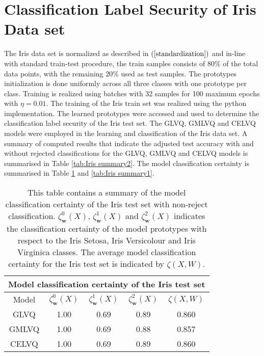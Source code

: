 \documentclass[english]{HSMW-Thesis}
\begin{document}
\section{Classification Label Security of Iris Data set}
The Iris data set is normalized as described in $\left( \ref{standardization}\right) $  and in-line with standard train-test procedure, the train samples consists of $80\%$ of the total data points, with the remaining $20\%$ used as test samples. The prototypes initialization is done uniformly across all three classes with one prototype per class. Training is realized using batches with 32 samples for 100 maximum epochs with $\eta =0.01$. The training of the Iris train set was realized using the python implementation\cite{Ravichandran2020}.
The learned prototypes were accessed and used to determine the classification label security of the Iris test set. The GLVQ, GMLVQ and CELVQ models were employed in the learning and classification of the Iris data set. A summary of computed results that indicate the adjusted test accuracy with and without rejected classifications for the GLVQ, GMLVQ and CELVQ models is summarised in Table \ref{tab:Iris summary2}. The model classification certainty is summarised in Table \ref{tab:Iris summary} and \ref{tab:Iris summary1}.
\begin{table}[H]
	\centering
	\begin{tabular}{ |c|c|c|c|c|  }
		\hline
		\multicolumn{5}{|c|}{Model classification certainty of the Iris test set} \\
		\hline
		Model &$\zeta_{\mathbf{w}}^{0}(X) $   & $\zeta_{\mathbf{w}}^{1}(X)$ &$\zeta_{\mathbf{w}}^{2}(X)$  &$\zeta(X,W)$   \\
		\hline
		GLVQ & 1.00 &0.69  & 0.89 &0.860  \\
		GMLVQ &1.00 &0.69  &0.88 &0.857   \\
		CELVQ  &1.00 &0.69  &0.89 & 0.860   \\		
		\hline
	\end{tabular}
	\caption[Summary of model classification certainty of the Iris test set]{\label{tab:Iris summary}This table contains a summary of the model classification certainty of the Iris test set with non-reject classification.\hspace{2pt} $\zeta_{\mathbf{w}}^{0}(X) $,\hspace{2pt} $\zeta_{\mathbf{w}}^{1}(X)$\hspace{2pt} and\hspace{2pt} $\zeta_{\mathbf{w}}^{2}(X)$\hspace{2pt} indicates the classification certainty of the model prototypes with respect to the Iris Setosa, Iris Versicolour and Iris Virginica classes. The average model classification certainty for the Iris test set is indicated by\hspace{2pt} $\zeta(X,W)$.}
	

\end{table}
\end{document}
